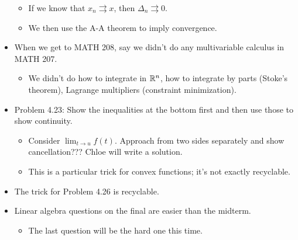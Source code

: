\documentclass[../../notes.tex]{subfiles}
\begin{document}
\begin{itemize}
\begin{itemize}
        \item If we know that $x_n\rightrightarrows x$, then $\Delta_n\rightrightarrows 0$.
        \item We then use the A-A theorem to imply convergence.
    \end{itemize}
    \item When we get to MATH 208, say we didn't do any multivariable calculus in MATH 207.
    \begin{itemize}
        \item We didn't do how to integrate in $\mathbb{R}^n$, how to integrate by parts (Stoke's theorem), Lagrange multipliers (constraint minimization).
    \end{itemize}
    \item Problem 4.23: Show the inequalities at the bottom first and then use those to show continuity.
    \begin{itemize}
        \item Consider $\lim_{t\to u}f(t)$. Approach from two sides separately and show cancellation??? Chloe will write a solution.
        \item This is a particular trick for convex functions; it's not exactly recyclable.
    \end{itemize}
    \item The trick for Problem 4.26 is recyclable.
    \item Linear algebra questions on the final are easier than the midterm.
    \begin{itemize}
        \item The last question will be the hard one this time.
    \end{itemize}
\end{itemize}
\end{document}

